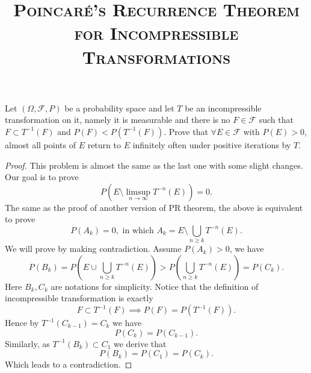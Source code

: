 
\title{\textsc{Poincaré’s Recurrence Theorem for Incompressible
Transformations}}

\maketitle
        
\begin{pro}
		Let $\left( \Omega ,\mathcal{F},P \right) $ be a probability space and let $T$ be
an incompressible transformation on it, namely it is measurable and
there is no $F \in \mathcal{F}$ such that $F\subset T^{-1}(F)$ and $P\left( F \right) < P\left( T^{-1}(F) \right) $.
Prove that $\forall E\in \mathcal{F}$ with $P\left( E \right) >0$, almost all points of $E$ return
to $E$ infinitely often under positive iterations by $T$.
\end{pro}
\begin{proof}
This problem is almost the same as the last one with some slight changes. 
Our goal is to prove 
\[
		P\left( E \setminus \limsup_{n \to \infty} T^{-n}(E) \right) = 0 
.\] 
The same as the proof of another version of PR theorem, the above is equivalent to prove
\[
		P\left( A_{k} \right) =0, \text{ in which } A_{k} = E \setminus \bigcup_{n\ge k} 
		T^{-n}(E)
.\] 
We will prove by making contradiction. Assume $P\left( A_{k} \right) > 0$, we have
\[
		P\left( B_{k} \right) =	P\left( E \cup \bigcup_{n\ge k} T^{-n}(E) \right) > 
		P\left( \bigcup_{n\ge k} T^{-n}(E)\right) = P\left( C_{k} \right) 
.\] 
Here $B_{k},C_{k}$ are notations for simplicity. Notice that the definition of incompressible 
transformation is exactly
\[
		F\subset T^{-1}\left( F \right)  \implies P(F) = P( T^{-1}(F))
.\]
Hence by $T^{-1}\left( C_{k-1} \right) = C_{k} $ we have 
\[
		P\left( C_{k} \right)  = P\left( C_{k-1} \right) 
.\] 
Similarly, as $T^{-1}\left( B_{k} \right) \subset C_{1}$ we derive that 
\[
		P\left( B_{k} \right)  = P\left( C_{1} \right) = P\left( C_{k} \right) 
.\]
Which leads to a contradiction.
\end{proof}

